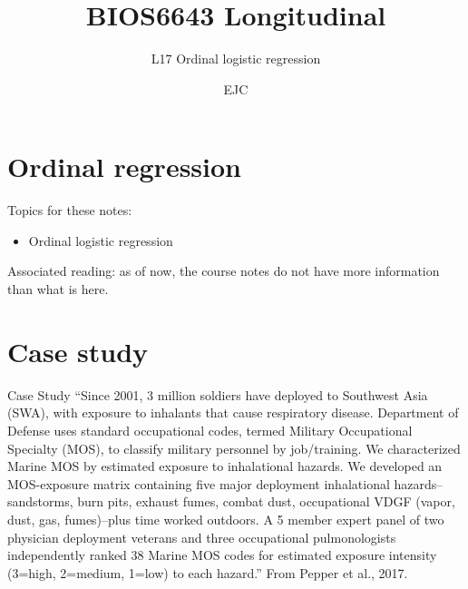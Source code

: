 \documentclass[
  9pt,
  ignorenonframetext,
]{beamer}
\title{BIOS6643 Longitudinal}
\subtitle{L17 Ordinal logistic regression}
\author{EJC}
\date{}
\institute{Department of Biostatistics \& Informatics}
\providecommand{\tightlist}{%
  \setlength{\itemsep}{0pt}\setlength{\parskip}{0pt}}
\begin{document}
\frame{\titlepage}

\begin{frame}[allowframebreaks]
  \tableofcontents[hideallsubsections]
\end{frame}
\hypertarget{ordinal-regression}{%
\section{Ordinal regression}\label{ordinal-regression}}

\begin{frame}{Topics for these notes:}
\protect\hypertarget{topics-for-these-notes}{}
\begin{itemize}
\tightlist
\item
  Ordinal logistic regression
\end{itemize}

Associated reading: as of now, the course notes do not have more
information than what is here.
\end{frame}

\hypertarget{case-study}{%
\section{Case study}\label{case-study}}

\begin{frame}{Case Study}
\protect\hypertarget{case-study-1}{}
``Since 2001, 3 million soldiers have deployed to Southwest Asia (SWA),
with exposure to inhalants that cause respiratory disease. Department of
Defense uses standard occupational codes, termed Military Occupational
Specialty (MOS), to classify military personnel by job/training. We
characterized Marine MOS by estimated exposure to inhalational hazards.
We developed an MOS-exposure matrix containing five major deployment
inhalational hazards--sandstorms, burn pits, exhaust fumes, combat dust,
occupational VDGF (vapor, dust, gas, fumes)--plus time worked outdoors.
A 5 member expert panel of two physician deployment veterans and three
occupational pulmonologists independently ranked 38 Marine MOS codes for
estimated exposure intensity (3=high, 2=medium, 1=low) to each hazard.''
From Pepper et al., 2017.
\end{frame}
\end{document}
